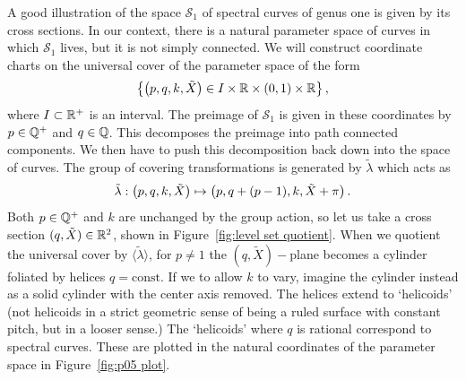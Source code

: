\documentclass{article}
\begin{document}
A good illustration of the space $\mathcal{S}_1$ of spectral curves of genus one is given by its cross sections. In our context, there is a natural parameter space of curves in which $\mathcal{S}_1$ lives, but it is not simply connected. We will construct coordinate charts on the universal cover of the parameter space of the form
\[
\left\{ \left(p,q,k,\tilde{X}\right) \in I \times \mathbb{R} \times (0,1) \times \mathbb{R} \right\},
\]
where $I\subset\mathbb{R}^+$ is an interval. The preimage of $\mathcal{S}_1$ is given in these coordinates by $p\in\mathbb{Q}^+$ and $q\in\mathbb{Q}$. 
This decomposes the preimage into path connected components. 
We then have to push this decomposition back down into the space of curves.
The group of covering transformations is generated by $\tilde{\lambda}$ which acts as
\[
\tilde{\lambda} : \left(p,q,k,\tilde{X}\right) \mapsto \left(p,q + (p-1),k,\tilde{X} + \pi\right).
\]
Both $p\in\mathbb{Q}^+$ and $k$ are unchanged by the group action, so let us take a cross section $(q,\tilde{X}) \in \mathbb{R}^2$, shown in Figure~\ref{fig:level set quotient}. When we quotient the universal cover by $\langle\tilde{\lambda}\rangle$, for $p\neq1$ the $(q,\tilde{X})-$plane becomes a cylinder foliated by helices $q=\text{const}$. If we to allow $k$ to vary, imagine the cylinder instead as a solid cylinder with the center axis removed. The helices extend to `helicoids' (not helicoids in a strict geometric sense of being a ruled surface with constant pitch, but in a looser sense.) The `helicoids' where $q$ is rational correspond to spectral curves. These are plotted in the natural coordinates of the parameter space in Figure~\ref{fig:p05 plot}.
\end{document}
